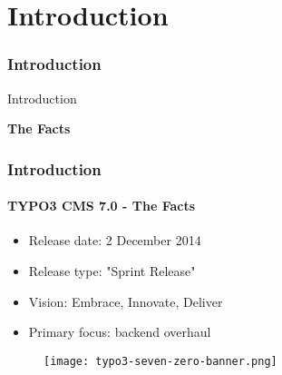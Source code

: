 %

\section{Introduction}
\begin{frame}[fragile]
	\frametitle{Introduction}

	\begin{center}\huge{Introduction}\end{center}
	\begin{center}\huge{\color{typo3darkgrey}\textbf{The Facts}}\end{center}

\end{frame}


\begin{frame}[fragile]
	\frametitle{Introduction}
	\framesubtitle{TYPO3 CMS 7.0 - The Facts}

	\begin{itemize}
		\item Release date: 2 December 2014
		\item Release type: "Sprint Release"
		\item Vision: Embrace, Innovate, Deliver
		\item Primary focus: backend overhaul
	\end{itemize}

	\begin{figure}
		\texttt{[image: typo3-seven-zero-banner.png]}
	\end{figure}

\end{frame}

